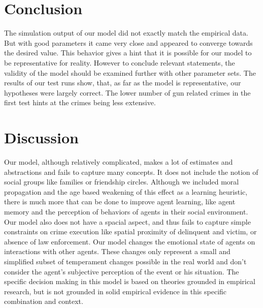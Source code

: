 \documentclass{JASSS}
\begin{document}
\section{Conclusion}
The simulation output of our model did not exactly match the empirical data. But with good parameters
it came very close and appeared to converge towards the desired value.
This behavior gives a hint that it is possible for our model to be representative for reality.
However to conclude relevant statements, the validity of the model should be examined further with other parameter sets.
The results of our test runs show, that, as far as the model is representative, our hypotheses were largely correct. The lower number of gun related crimes in the first test hints at the crimes being less extensive.

\section{Discussion}
Our model, although relatively complicated, makes a lot of estimates and abstractions and fails
to capture many concepts. It does not include the notion of social groups like families or
friendship circles. Although we included moral propagation and the age based weakening of this
effect as a learning heuristic, there is much more that can be done to improve agent learning,
like agent memory and the perception of behaviors of agents in their social environment. Our model
also does not have a spacial aspect, and thus fails to capture simple constraints on crime execution
like spatial proximity of delinquent and victim, or absence of law enforcement.
Our model changes the emotional state of agents on interactions with other agents. These changes
only represent a small and simplified subset of temperament changes possible in the real world
and don't consider the agent's subjective perception of the event or his situation. The specific
decision making in this model is based on theories grounded in empirical research, but is not
grounded in solid empirical evidence in this specific combination and context.
\end{document}
